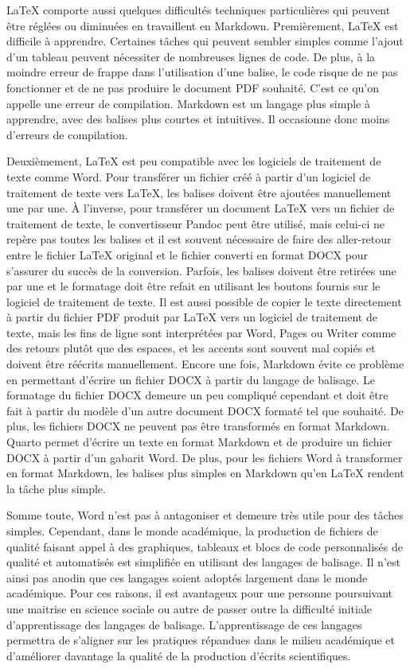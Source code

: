 \documentclass[
  letterpaper,
  DIV=11,
  numbers=noendperiod]{scrreprt}
\begin{document}
LaTeX comporte aussi quelques difficultés techniques particulières qui
peuvent être réglées ou diminuées en travaillent en Markdown.
Premièrement, LaTeX est difficile à apprendre. Certaines tâches qui
peuvent sembler simples comme l'ajout d'un tableau peuvent nécessiter de
nombreuses lignes de code. De plus, à la moindre erreur de frappe dans
l'utilisation d'une balise, le code risque de ne pas fonctionner et de
ne pas produire le document PDF souhaité. C'est ce qu'on appelle une
erreur de compilation. Markdown est un langage plus simple à apprendre,
avec des balises plus courtes et intuitives. Il occasionne donc moins
d'erreurs de compilation.

Deuxièmement, LaTeX est peu compatible avec les logiciels de traitement
de texte comme Word. Pour transférer un fichier créé à partir d'un
logiciel de traitement de texte vers LaTeX, les balises doivent être
ajoutées manuellement une par une. À l'inverse, pour transférer un
document LaTeX vers un fichier de traitement de texte, le convertisseur
Pandoc peut être utilisé, mais celui-ci ne repère pas toutes les balises
et il est souvent nécessaire de faire des aller-retour entre le fichier
LaTeX original et le fichier converti en format DOCX pour s'assurer du
succès de la conversion. Parfois, les balises doivent être retirées une
par une et le formatage doit être refait en utilisant les boutons
fournis sur le logiciel de traitement de texte. Il est aussi possible de
copier le texte directement à partir du fichier PDF produit par LaTeX
vers un logiciel de traitement de texte, mais les fins de ligne sont
interprétées par Word, Pages ou Writer comme des retours plutôt que des
espaces, et les accents sont souvent mal copiés et doivent être réécrits
manuellement. Encore une fois, Markdown évite ce problème en permettant
d'écrire un fichier DOCX à partir du langage de balisage. Le formatage
du fichier DOCX demeure un peu compliqué cependant et doit être fait à
partir du modèle d'un autre document DOCX formaté tel que souhaité. De
plus, les fichiers DOCX ne peuvent pas être transformés en format
Markdown. Quarto permet d'écrire un texte en format Markdown et de
produire un fichier DOCX à partir d'un gabarit Word. De plus, pour les
fichiers Word à transformer en format Markdown, les balises plus simples
en Markdown qu'en LaTeX rendent la tâche plus simple.

Somme toute, Word n'est pas à antagoniser et demeure très utile pour des
tâches simples. Cependant, dans le monde académique, la production de
fichiers de qualité faisant appel à des graphiques, tableaux et blocs de
code personnalisés de qualité et automatisés est simplifiée en utilisant
des langages de balisage. Il n'est ainsi pas anodin que ces langages
soient adoptés largement dans le monde académique. Pour ces raisons, il
est avantageux pour une personne poursuivant une maitrise en science
sociale ou autre de passer outre la difficulté initiale d'apprentissage
des langages de balisage. L'apprentissage de ces langages permettra de
s'aligner sur les pratiques répandues dans le milieu académique et
d'améliorer davantage la qualité de la production d'écrits
scientifiques.
\end{document}
